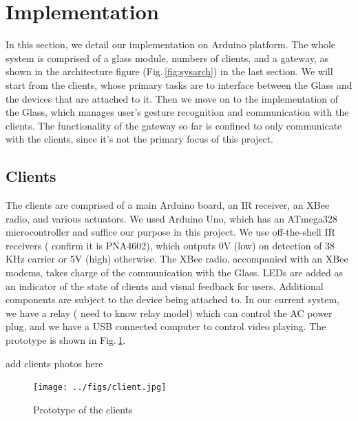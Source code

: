 \section{Implementation}
\label{sec:implementation}

In this section, we detail our implementation on Arduino \cite{Arduino} platform. The whole system is comprised of a glass module, numbers of clients, and a gateway, as shown in the architecture figure (Fig.\,\ref{fig:sysarch}) in the last section. We will start from the clients, whose primary tasks are to interface between the Glass and the devices that are attached to it. Then we move on to the implementation of the Glass, which manages user's gesture recognition and communication with the clients. The functionality of the gateway so far is confined to only communicate with the clients, since it's not the primary focus of this project.

\subsection{Clients}
The clients are comprised of a main Arduino board, an IR receiver, an XBee radio, and various actuators. We used Arduino Uno, which has an ATmega328 microcontroller and suffice our purpose in this project. We use off-the-shell IR receivers ({\color{red} confirm it is PNA4602}), which outputs 0V (low) on detection of 38 KHz carrier or 5V (high) otherwise. The XBee radio, accompanied with an XBee modems, takes charge of the communication with the Glass. LEDs are added as an indicator of the state of clients and visual feedback for users. Additional components are subject to the device being attached to. In our current system, we have a relay ({\color{red} need to know relay model}) which can control the AC power plug, and we have a USB connected computer to control video playing. The prototype is shown in Fig.\,\ref{fig:client}.

{\color{red} add clients photos here}
\begin{figure}
  \centering
  \texttt{[image: ../figs/client.jpg]}
  \caption{Prototype of the clients}
  \label{fig:client}
\end{figure}

